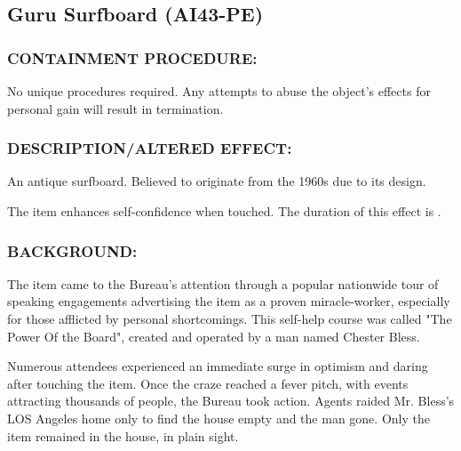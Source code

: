 \subsection*{Guru Surfboard (AI43-PE)}
\subsubsection*{CONTAINMENT PROCEDURE:}
\par No unique procedures required. Any
attempts to abuse the object's effects
for personal gain will result in
termination.
\subsubsection*{DESCRIPTION/ALTERED EFFECT:}
\par An antique surfboard. Believed to
originate from the 1960s due to its
design.
\par The item enhances self-confidence when touched. The duration
of this effect is .
\subsubsection*{BACKGROUND:}
\par The item came to the Bureau's attention through a popular
nationwide tour of speaking engagements advertising the item as
a proven miracle-worker, especially for those afflicted by personal
shortcomings. This self-help course was called "The Power Of the
Board", created and operated by a man named Chester Bless.
\par Numerous attendees experienced an immediate surge in optimism
and daring after touching the item. Once the craze reached a
fever pitch, with events attracting thousands of people, the
Bureau took action. Agents raided Mr. Bless's LOS Angeles home
only to find the house empty and the man gone. Only the item
remained in the house, in plain sight.